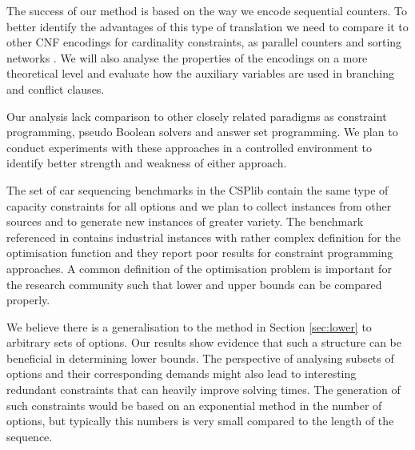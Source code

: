 \documentclass[]{llncs}
\begin{document}
The success of our method is based on the way we encode sequential counters. To better identify the advantages of this
type of translation we need to compare it to other CNF encodings for cardinality constraints, as parallel counters and
sorting networks \cite{Sinz05}\cite{Een06}. We will also analyse the properties of the encodings on a more theoretical
level and evaluate how the auxiliary variables are used in branching and conflict clauses. 

Our analysis lack comparison to other closely related paradigms as constraint programming, pseudo Boolean solvers and
answer set programming.  We plan to conduct experiments with these approaches in a controlled environment to identify
better strength and weakness of either approach. 

The set of car sequencing benchmarks in the CSPlib contain the same type of capacity constraints for all options and we
plan to collect instances from other sources and to generate new instances of greater variety. The benchmark referenced
in \cite{Solnon08} contains industrial instances with rather complex definition for the optimisation function and they
report poor results for constraint programming approaches. A common definition of the optimisation problem is important
for the research community such that lower and upper bounds can be compared properly. 

We believe there is a generalisation to the method in Section \ref{sec:lower} to arbitrary sets of options. Our results
show evidence that such a structure can be beneficial in determining lower bounds. The perspective of analysing subsets
of options and their corresponding demands might also lead to interesting redundant constraints that can heavily improve
solving times. The generation of such constraints would be based on an exponential method in the number of options, but
typically this numbers is very small compared to the length of the sequence. 



\end{document}

